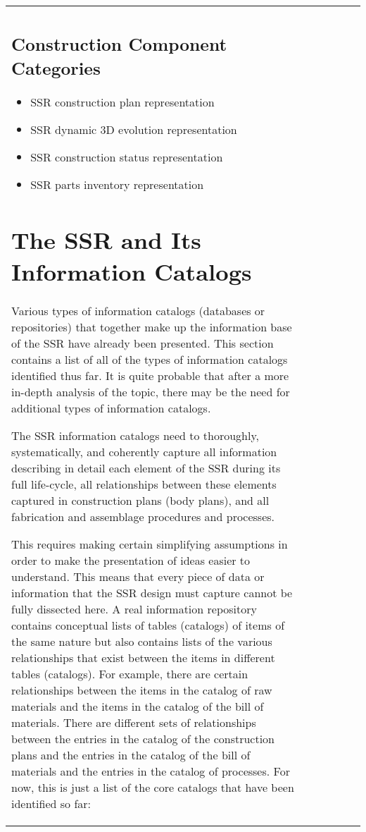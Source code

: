 \begin{table}[h]
\begin{center}
\begin{tabular}{| l l l l l l |}
\subsection{Construction Component Categories}
\begin{itemize}
\item SSR construction plan representation
\item SSR dynamic 3D evolution representation
\item SSR construction status representation
\item SSR parts inventory representation
\end{itemize}
\index{self-replication!design!components|)}

\section{The SSR and Its Information Catalogs}

\index{self-replication!design!information catalogs|(}
Various types of information catalogs (databases
or repositories) that together make up the information base of the SSR have already been presented.
This section contains a list of all of the types of information catalogs
identified thus far. It is quite probable that after a more in-depth analysis of the topic, there may be the need for additional types of information catalogs.

The SSR information catalogs need to thoroughly, systematically, and coherently capture 
all information describing in detail each element of the SSR during its
full life-cycle, all relationships between these elements captured in
construction plans (body plans), and all fabrication and assemblage
procedures and processes.

This requires making certain simplifying assumptions in order to make the presentation of ideas easier to understand. This means that every piece of data or information that the SSR design must capture cannot be fully dissected here.
A real information repository contains
conceptual lists of tables (catalogs) of items of the same nature but
also contains lists of the various relationships that exist between the
items in different tables (catalogs).  For example, there are certain
relationships between the items in the catalog of raw materials and the
items in the catalog of the bill of materials. There are
different sets of relationships between the entries in the catalog of
the construction plans and the entries in the catalog of the bill of
materials and the entries in the catalog of processes.  For now, this
is just a list of the core catalogs that have been identified so far:


\end{tabular}
\end{center}
\end{table}
